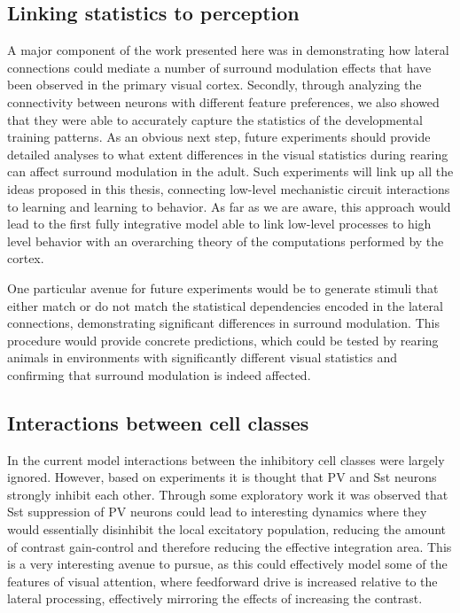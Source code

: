 \subsection{Linking statistics to perception}

A major component of the work presented here was in demonstrating how
lateral connections could mediate a number of surround modulation
effects that have been observed in the primary visual cortex. Secondly,
through analyzing the connectivity between neurons with different
feature preferences, we also showed that they were able to accurately
capture the statistics of the developmental training patterns. As an
obvious next step, future experiments should provide detailed analyses
to what extent differences in the visual statistics during rearing can
affect surround modulation in the adult. Such experiments will link up
all the ideas proposed in this thesis, connecting low-level mechanistic circuit
interactions to learning and learning to behavior. As far as we are
aware, this approach would lead to the first fully integrative model able to
link low-level processes to high level behavior with an overarching
theory of the computations performed by the cortex.

One particular avenue for future experiments would be to generate
stimuli that either match or do not match the statistical
dependencies encoded in the lateral connections, demonstrating
significant differences in surround modulation. This procedure would provide
concrete predictions, which could be tested by rearing animals in
environments with significantly different visual statistics and
confirming that surround modulation is indeed affected.

\subsection{Interactions between cell classes}

In the current model interactions between the inhibitory cell classes
were largely ignored. However, based on experiments it is thought that
PV and Sst neurons strongly inhibit each other. Through some
exploratory work it was observed that Sst suppression of PV neurons
could lead to interesting dynamics where they would essentially
disinhibit the local excitatory population, reducing the amount of
contrast gain-control and therefore reducing the effective integration
area. This is a very interesting avenue to pursue, as this could
effectively model some of the features of visual attention, where
feedforward drive is increased relative to the lateral processing,
effectively mirroring the effects of increasing the contrast.

